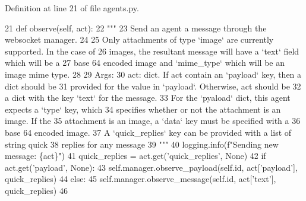 Definition at line 21 of file agents.\+py.


\begin{DoxyCode}
21     \textcolor{keyword}{def }observe(self, act):
22         \textcolor{stringliteral}{"""}
23 \textcolor{stringliteral}{        Send an agent a message through the websocket manager.}
24 \textcolor{stringliteral}{}
25 \textcolor{stringliteral}{        Only attachments of type `image` are currently supported. In the case of}
26 \textcolor{stringliteral}{        images, the resultant message will have a `text` field which will be a}
27 \textcolor{stringliteral}{        base 64 encoded image and `mime\_type` which will be an image mime type.}
28 \textcolor{stringliteral}{}
29 \textcolor{stringliteral}{        Args:}
30 \textcolor{stringliteral}{            act: dict. If act contain an `payload` key, then a dict should be}
31 \textcolor{stringliteral}{                provided for the value in `payload`. Otherwise, act should be}
32 \textcolor{stringliteral}{                a dict with the key `text` for the message.}
33 \textcolor{stringliteral}{                For the `pyaload` dict, this agent expects a `type` key, which}
34 \textcolor{stringliteral}{                specifies whether or not the attachment is an image. If the}
35 \textcolor{stringliteral}{                attachment is an image, a `data` key must be specified with a}
36 \textcolor{stringliteral}{                base 64 encoded image.}
37 \textcolor{stringliteral}{                A `quick\_replies` key can be provided with a list of string quick}
38 \textcolor{stringliteral}{                replies for any message}
39 \textcolor{stringliteral}{        """}
40         logging.info(f\textcolor{stringliteral}{"Sending new message: \{act\}"})
41         quick\_replies = act.get(\textcolor{stringliteral}{'quick\_replies'}, \textcolor{keywordtype}{None})
42         \textcolor{keywordflow}{if} act.get(\textcolor{stringliteral}{'payload'}, \textcolor{keywordtype}{None}):
43             self.manager.observe\_payload(self.id, act[\textcolor{stringliteral}{'payload'}], quick\_replies)
44         \textcolor{keywordflow}{else}:
45             self.manager.observe\_message(self.id, act[\textcolor{stringliteral}{'text'}], quick\_replies)
46 
\end{DoxyCode}
\mbox{\label{classparlai_1_1chat__service_1_1services_1_1websocket_1_1agents_1_1WebsocketAgent_a8e6bb97a0b0996be55dd7aacedc62dff}} 

